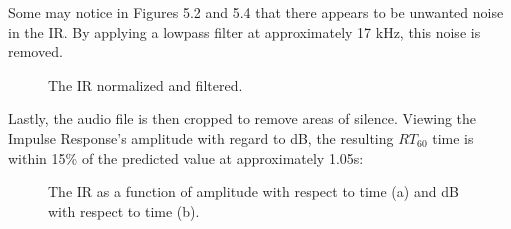 Some may notice in Figures 5.2 and 5.4 that there appears to be unwanted noise in the IR. By applying a lowpass filter at approximately 17 kHz, this noise is removed.

\begin{figure}[h] %
	\begin{center}
		\caption{The IR normalized and filtered.}
	\end{center}
\end{figure}
Lastly, the audio file is then cropped to remove areas of silence. Viewing the Impulse Response's amplitude with regard to dB, the resulting $RT_{60}$ time is within 15\% of the predicted value at approximately 1.05s:
\begin{figure}[h]
\begin{center}
 \hspace*{1.15cm}
\caption{The IR as a function of amplitude with respect to time (a) and dB with respect to time (b).}
\end{center}
\end{figure}
